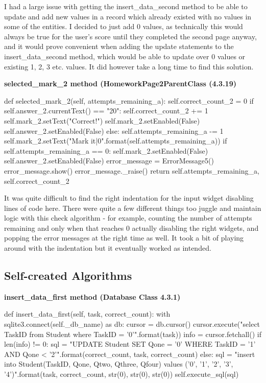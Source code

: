 I had a large issue with getting the insert\_data\_second method to be able to update and add new values in a record which already existed with no values in some of the entities. I decided to just add 0 values, as technically this would always be true for the user's score until they completed the second page anyway, and it would prove convenient when adding the update statements to the insert\_data\_second method, which would be able to update over 0 values or existing 1, 2, 3 etc. values. It did however take a long time to find this solution.

\textbf{selected\_mark\_2 method (HomeworkPage2ParentClass (4.3.19)}

\begin{python}
def selected_mark_2(self, attempts_remaining_a):
        self.correct_count_2 = 0
        if self.answer_2.currentText() == "20":
            self.correct_count_2 += 1
            self.mark_2.setText("Correct!")
            self.mark_2.setEnabled(False)
            self.answer_2.setEnabled(False)
        else:
            self.attempts_remaining_a -= 1
            self.mark_2.setText("Mark it|{0}".format(self.attempts_remaining_a))
            if self.attempts_remaining_a == 0:
                self.mark_2.setEnabled(False)
                self.answer_2.setEnabled(False)
            error_message = ErrorMessage5()
            error_message.show()
            error_message._raise()
        return self.attempts_remaining_a, self.correct_count_2
\end{python}

It was quite difficult to find the right indentation for the input widget disabling lines of code here. There were quite a few different things too juggle and maintain logic with this check algorithm - for example, counting the number of attempts remaining and only when that reaches 0 actually disabling the right widgets, and popping the error messages at the right time as well. It took a bit of playing around with the indentation but it eventually worked as intended.

\subsection{Self-created Algorithms}

\textbf{insert\_data\_first method (Database Class 4.3.1)}

\begin{python}
    def insert_data_first(self, task, correct_count):
        with sqlite3.connect(self._db_name) as db:
            cursor = db.cursor()
            cursor.execute("select TaskID from Student where TaskID = '{0}'".format(task))
            info = cursor.fetchall()
            if len(info) != 0:
                sql = "UPDATE Student SET Qone = '{0}' WHERE TaskID = '{1}' AND Qone < '{2}'".format(correct_count, task, correct_count)
            else:
                sql = "insert into Student(TaskID, Qone, Qtwo, Qthree, Qfour) values ('{0}', '{1}', '{2}', '{3}', '{4}')".format(task, correct_count, str(0), str(0), str(0))
            self.execute_sql(sql)
\end{python}

